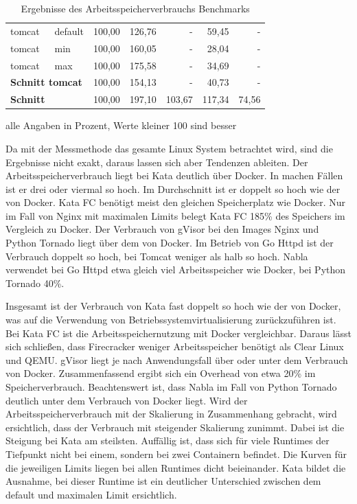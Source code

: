 \begin{table}[h]
\begin{tabularx}{\textwidth}{Xlrrrrr}
		tomcat & default & 100,00 & 126,76 & - & 59,45 & - \\
		tomcat & min & 100,00 & 160,05 & - & 28,04 & - \\
		tomcat & max & 100,00 & 175,58 & - & 34,69 & - \\ \hline
		\multicolumn{2}{l}{\textbf{Schnitt tomcat}} & 100,00 & 154,13 & - & 40,73 & - \\ \hline
		\textbf{Schnitt} & & 100,00 & 197,10 & 103,67 & 117,34 & 74,56 \\
		\hline
	\end{tabularx}
	\caption[Ergebnisse des Arbeitsspeicherverbrauchs Benchmarks]{Ergebnisse des Arbeitsspeicherverbrauchs Benchmarks}
	\footnotesize alle Angaben in Prozent, Werte kleiner 100 sind besser
	\label{tbl:ramergebnis}
\end{table}

Da mit der Messmethode das gesamte Linux System betrachtet wird, sind die Ergebnisse nicht exakt, daraus lassen sich aber Tendenzen ableiten.
Der Arbeitsspeicherverbrauch liegt bei Kata deutlich über Docker. In machen Fällen ist er drei oder viermal so hoch. Im Durchschnitt ist er doppelt so hoch wie der von Docker. Kata FC benötigt meist den gleichen Speicherplatz wie Docker. Nur im Fall von Nginx mit maximalen Limits belegt Kata FC 185\% des Speichers im Vergleich zu Docker. Der Verbrauch von gVisor bei den Images Nginx und Python Tornado liegt über dem von Docker. Im Betrieb von Go Httpd ist der Verbrauch doppelt so hoch, bei Tomcat weniger als halb so hoch. Nabla verwendet bei Go Httpd etwa gleich viel Arbeitsspeicher wie Docker, bei Python Tornado 40\%.

Insgesamt ist der Verbrauch von Kata fast doppelt so hoch wie der von Docker, was auf die Verwendung von Betriebssystemvirtualisierung zurückzuführen ist. Bei Kata FC ist die Arbeitsspeichernutzung mit Docker vergleichbar. Daraus lässt sich schließen, dass Firecracker weniger Arbeitsspeicher benötigt als Clear Linux und \ac{QEMU}.
gVisor liegt je nach Anwendungsfall über oder unter dem Verbrauch von Docker. Zusammenfassend ergibt sich ein Overhead von etwa 20\% im Speicherverbrauch. Beachtenswert ist, dass Nabla im Fall von Python Tornado deutlich unter dem Verbrauch von Docker liegt. 
Wird der Arbeitsspeicherverbrauch mit der Skalierung in Zusammenhang gebracht, wird ersichtlich, dass der Verbrauch mit steigender Skalierung zunimmt. Dabei ist die Steigung bei Kata am steilsten. Auffällig ist, dass sich für viele Runtimes der Tiefpunkt nicht bei einem, sondern bei zwei Containern befindet.
Die Kurven für die jeweiligen Limits liegen bei allen Runtimes dicht beieinander. Kata bildet die Ausnahme, bei dieser Runtime ist ein deutlicher Unterschied zwischen dem default und maximalen Limit ersichtlich.


